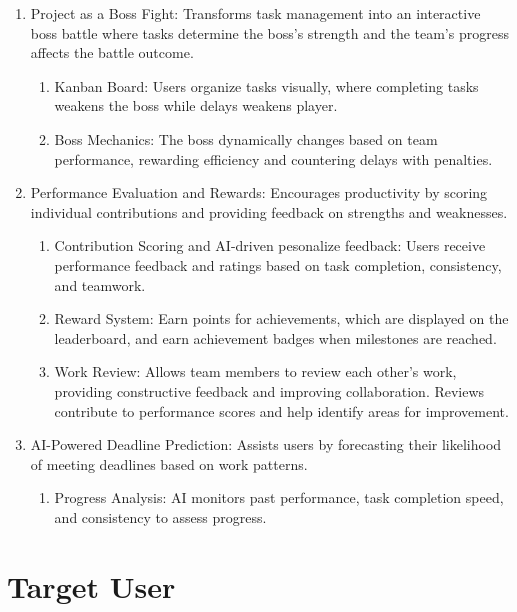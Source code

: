 \begin{enumerate}[leftmargin=80pt]  
    \item Project as a Boss Fight: Transforms task management into an interactive boss battle where tasks determine the boss’s strength and the team's progress affects the battle outcome.  
    \begin{enumerate}  
        \item Kanban Board: Users organize tasks visually, where completing tasks weakens the boss while delays weakens player.  
        \item Boss Mechanics: The boss dynamically changes based on team performance, rewarding efficiency and countering delays with penalties.  
    \end{enumerate}  

    \item Performance Evaluation and Rewards: Encourages productivity by scoring individual contributions and providing feedback on strengths and weaknesses.  
    \begin{enumerate}  
        \item Contribution Scoring and AI-driven pesonalize feedback: Users receive performance feedback and ratings based on task completion, consistency, and teamwork.  
        \item Reward System: Earn points for achievements, which are displayed on the leaderboard, and earn achievement badges when milestones are reached.  
        \item Work Review: Allows team members to review each other’s work, providing constructive feedback and improving collaboration. Reviews contribute to performance scores and help identify areas for improvement.  
    \end{enumerate}  

    \item AI-Powered Deadline Prediction: Assists users by forecasting their likelihood of meeting deadlines based on work patterns.  
    \begin{enumerate}  
        \item Progress Analysis: AI monitors past performance, task completion speed, and consistency to assess progress.  
    \end{enumerate}  
\end{enumerate}  


\section{Target User}  
\label{section:target-user}  

